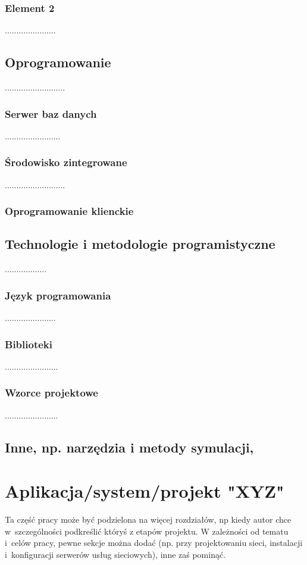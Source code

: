 \documentclass[twoside,12pt]{report}
\begin{document}
\subsection{Element 2}
......................

\section{Oprogramowanie}
..........................
\subsection{Serwer baz danych}
........................
\subsection{Środowisko zintegrowane}
..........................
\subsection{Oprogramowanie klienckie}

\section{Technologie i metodologie programistyczne}
..................
\subsection{Język programowania}
......................
\subsection{Biblioteki}
.......................
\subsection{Wzorce projektowe}
.......................

\section{Inne, np. narzędzia i metody symulacji, }

\chapter{Aplikacja/system/projekt "XYZ"} \label{rozdz.czesc.prakt}
Ta część pracy może być podzielona na więcej rozdziałów, np kiedy autor chce
w~szczególności podkreślić któryś z etapów projektu. W zależności od tematu i~celów pracy, pewne sekcje można dodać (np. przy projektowaniu sieci, instalacji
i~konfiguracji serwerów usług sieciowych), inne zaś pominąć.
\end{document}
